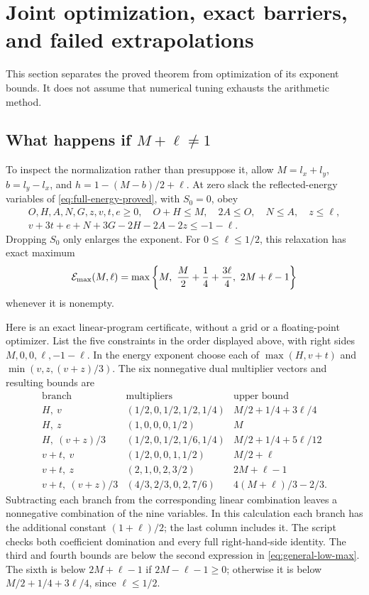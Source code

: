 \documentclass[12pt]{article}
\begin{document}
\section{Joint optimization, exact barriers, and failed extrapolations}
\label{sec:optimization}

This section separates the proved theorem from optimization of its
exponent bounds.  It does not assume that numerical tuning exhausts
the arithmetic method.

\subsection{\texorpdfstring{What happens if \(M+\ell\ne1\)}{Allowing general total length}}
To inspect the normalization rather than presuppose it, allow
\(M=l_x+l_y\), \(b=l_y-l_x\), and
\(h=1-(M-b)/2+\ell\).
At zero slack the reflected-energy variables of
\eqref{eq:full-energy-proved}, with \(S_0=0\), obey
\[
\begin{gathered}
 O,H,A,N,G,z,v,t,e\ge0,\quad O+H\le M,\quad
 2A\le O,\quad N\le A,\quad z\le\ell,\\
 v+3t+e+N+3G-2H-2A-2z\le-1-\ell .
\end{gathered}
\]
Dropping \(S_0\) only enlarges the exponent.
For \(0\le\ell\le1/2\), this relaxation has exact maximum
\begin{equation}\label{eq:general-low-max}
 {\cal E}_{\max}(M,\ell)=
 \max\left\{M,\ \frac M2+\frac14+\frac{3\ell}4,\
                         2M+\ell-1\right\}
\end{equation}
whenever it is nonempty.

Here is an exact linear-program certificate, without a grid or a
floating-point optimizer.  List the five constraints in the order
displayed above, with right sides \(M,0,0,\ell,-1-\ell\).
In the energy exponent choose each of
\(\max(H,v+t)\) and \(\min(v,z,(v+z)/3)\).
The six nonnegative dual multiplier vectors and resulting bounds are
\[
\begin{array}{c|c|c}
 \text{branch}&\text{multipliers}&\text{upper bound}\\ \hline
 H,\ v&(1/2,0,1/2,1/2,1/4)&M/2+1/4+3\ell/4\\
 H,\ z&(1,0,0,0,1/2)&M\\
 H,\ (v+z)/3&(1/2,0,1/2,1/6,1/4)&M/2+1/4+5\ell/12\\
 v+t,\ v&(1/2,0,0,1,1/2)&M/2+\ell\\
 v+t,\ z&(2,1,0,2,3/2)&2M+\ell-1\\
 v+t,\ (v+z)/3&(4/3,2/3,0,2,7/6)&4(M+\ell)/3-2/3 .
\end{array}
\]
Subtracting each branch from the corresponding linear combination
leaves a nonnegative combination of the nine variables.
In this calculation each branch has the additional constant
\((1+\ell)/2\); the last column includes it.  The script checks
both coefficient domination and every full right-hand-side identity.
The third and fourth bounds are below the second expression in
\eqref{eq:general-low-max}.
The sixth is below \(2M+\ell-1\) if \(2M-\ell-1\ge0\);
otherwise it is below \(M/2+1/4+3\ell/4\), since \(\ell\le1/2\).
\end{document}
